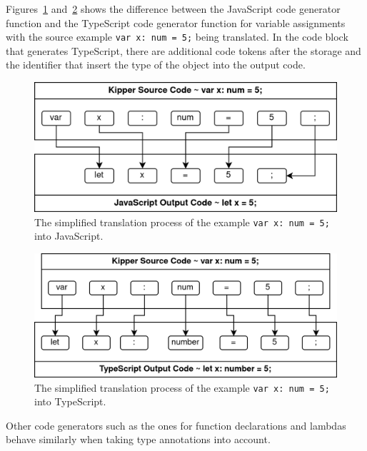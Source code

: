 Figures~\ref{fig:implementation:kipper-to-javascript-translation-example} and~\ref{fig:implementation:kipper-to-typescript-translation-example} shows the difference between the JavaScript code generator function and the TypeScript code generator function for variable assignments with the source example \lstinline|var x: num = 5;| being translated. In the code block that generates TypeScript, there are additional code tokens after the storage and the identifier that insert the type of the object into the output code.

\begin{figure}[h!]
	\centering
	\includegraphics[scale=1.1]{./pics/Kipper-to-JavaScript-Translation-Example}
	\caption{The simplified translation process of the example \lstinline|var x: num = 5;| into JavaScript.}
	\label{fig:implementation:kipper-to-javascript-translation-example}
\end{figure}

\begin{figure}[h!]
	\centering
	\includegraphics[scale=1.1]{./pics/Kipper-to-TypeScript-Translation-Example}
	\caption{The simplified translation process of the example \lstinline|var x: num = 5;| into TypeScript.}
	\label{fig:implementation:kipper-to-typescript-translation-example}
\end{figure}

Other code generators such as the ones for function declarations and lambdas behave similarly when taking type annotations into account.

